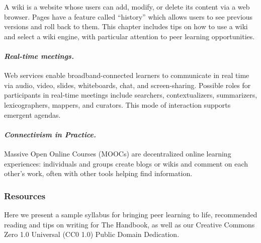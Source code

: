 A wiki is a website whose users can add, modify, or delete its content
via a web browser. Pages have a feature called ``history'' which allows
users to see previous versions and roll back to them. This chapter
includes tips on how to use a wiki and select a wiki engine, with
particular attention to peer learning opportunities.

\hypertarget{real-time-meetings.}{%
\paragraph{\texorpdfstring{\emph{Real-time
meetings.}}{Real-time meetings.}}\label{real-time-meetings.}}

Web services enable broadband-connected learners to communicate in real
time via audio, video, slides, whiteboards, chat, and screen-sharing.
Possible roles for participants in real-time meetings include searchers,
contextualizers, summarizers, lexicographers, mappers, and curators.
This mode of interaction supports emergent agendas.

\hypertarget{connectivism-in-practice.}{%
\paragraph{\texorpdfstring{\emph{Connectivism in
Practice.}}{Connectivism in Practice.}}\label{connectivism-in-practice.}}

Massive Open Online Courses (MOOCs) are decentralized online learning
experiences: individuals and groups create blogs or wikis and comment on
each other's work, often with other tools helping find information.

\hypertarget{resources}{%
\subsubsection{Resources}\label{resources}}

Here we present a sample syllabus for bringing peer learning to life,
recommended reading and tips on writing for The Handbook, as well as our
Creative Commons Zero 1.0 Universal (CC0 1.0) Public Domain Dedication.
